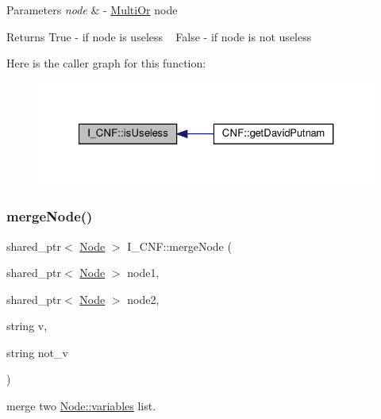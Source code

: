 \begin{DoxyParams}{Parameters}
{\em node} & -\/ \hyperlink{class_multi_or}{Multi\+Or} node \\
\hline
\end{DoxyParams}
\begin{DoxyReturn}{Returns}
True -\/ if node is useless ~\newline
 False -\/ if node is not useless 
\end{DoxyReturn}
Here is the caller graph for this function\+:\nopagebreak
\begin{figure}[H]
\begin{center}
\leavevmode
\includegraphics[width=327pt]{d5/d80/struct_i___c_n_f_ae9f978965edae4ab57c692544cb72d01_icgraph}
\end{center}
\end{figure}
\mbox{\label{struct_i___c_n_f_a62586e691ebfb00696be6bf9710f4da4}} 
\subsubsection{\texorpdfstring{merge\+Node()}{mergeNode()}}
{\footnotesize\ttfamily shared\+\_\+ptr$<$ \hyperlink{class_node}{Node} $>$ I\+\_\+\+C\+N\+F\+::merge\+Node (\begin{DoxyParamCaption}\item[{shared\+\_\+ptr$<$ \hyperlink{class_node}{Node} $>$}]{node1,  }\item[{shared\+\_\+ptr$<$ \hyperlink{class_node}{Node} $>$}]{node2,  }\item[{string}]{v,  }\item[{string}]{not\+\_\+v }\end{DoxyParamCaption})\hspace{0.3cm}{\ttfamily [private]}}



merge two \hyperlink{class_node_a350b631f3a9192bfa23bc266f6b8da02}{Node\+::variables} list. 

